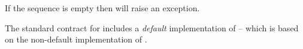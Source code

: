 \begin{aside}
If the sequence is empty then  will raise an exception.
\end{aside}

\begin{aside}
The standard contract for  includes a \emph{default} implementation of  -- which is based on the non-default implementation of .
\end{aside}

%
%
%
%
%
%
%
%

